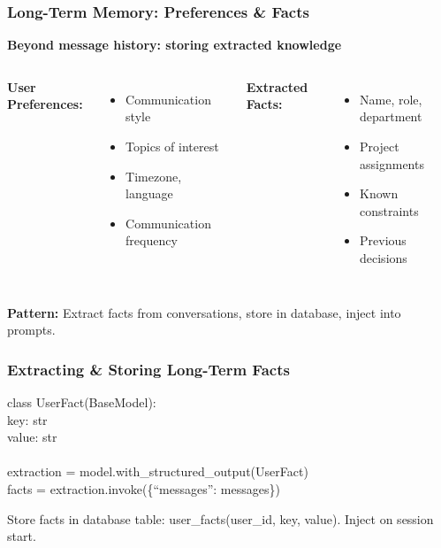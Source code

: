\documentclass[aspectratio=169,11pt]{beamer}
\begin{document}
\begin{frame}
  \frametitle{Long-Term Memory: Preferences \& Facts}
  \textbf{Beyond message history: storing extracted knowledge}
  \vspace{0.6em}
  \begin{columns}
    \textbf{User Preferences:}
    \begin{itemize}
      \item Communication style
      \item Topics of interest
      \item Timezone, language
      \item Communication frequency
    \end{itemize}

    \textbf{Extracted Facts:}
    \begin{itemize}
      \item Name, role, department
      \item Project assignments
      \item Known constraints
      \item Previous decisions
    \end{itemize}
  \end{columns}
  \vspace{0.8em}
  \textbf{Pattern:} Extract facts from conversations, store in database, inject into prompts.
\end{frame}

\begin{frame}
  \frametitle{Extracting \& Storing Long-Term Facts}
  \begin{codebox}
    \ttfamily\small
    class UserFact(BaseModel): \\
    \hspace{2em} key: str \\
    \hspace{2em} value: str \\
    \\
    extraction = model.with\_structured\_output(UserFact) \\
    facts = extraction.invoke(\{``messages'': messages\})
  \end{codebox}
  \vspace{0.6em}
  \begin{tipbox}[Storage]
    Store facts in database table: user\_facts(user\_id, key, value). Inject on session start.
  \end{tipbox}
\end{frame}
\end{document}
